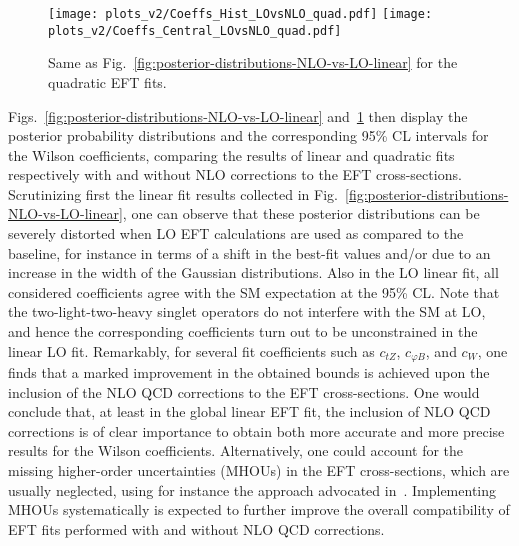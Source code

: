 \begin{figure}[htbp]
  \begin{center}
    \texttt{[image: plots\_v2/Coeffs\_Hist\_LOvsNLO\_quad.pdf]}
    \texttt{[image: plots\_v2/Coeffs\_Central\_LOvsNLO\_quad.pdf]}
    \caption{\small
      Same as Fig.~\ref{fig:posterior-distributions-NLO-vs-LO-linear}
      for the quadratic EFT fits.
      \label{fig:posterior-distributions-NLO-vs-LO-quad} }
  \end{center}
\end{figure}

Figs.~\ref{fig:posterior-distributions-NLO-vs-LO-linear}
and~\ref{fig:posterior-distributions-NLO-vs-LO-quad} then display the
posterior probability distributions 
and the corresponding 95\% CL intervals for the Wilson coefficients,
comparing the results of linear and quadratic fits respectively
with and without NLO corrections to the EFT cross-sections.
%
Scrutinizing first the linear fit results collected in
Fig.~\ref{fig:posterior-distributions-NLO-vs-LO-linear},
one can observe that these posterior distributions can be
severely distorted when LO EFT calculations are used as compared
to the baseline,
for instance in terms of a shift in the best-fit values and/or due
to an increase in the width of the Gaussian distributions.
%
Also in the LO linear fit, all considered coefficients
agree with the SM expectation at the 95\% CL.
%
Note that the two-light-two-heavy singlet operators do not
interfere with the SM at LO,
and hence the corresponding coefficients turn out to be unconstrained
in the linear LO fit.
%
Remarkably, for several fit coefficients
such as $c_{tZ}$, $c_{\varphi B}$, and $c_{W}$, one finds that a marked
improvement in the obtained bounds is achieved upon the inclusion
of the NLO QCD corrections to the EFT cross-sections.
%
One would conclude that, at least in the global linear EFT fit,
the inclusion of NLO QCD corrections
is of clear importance to obtain both more accurate and more precise results
for the Wilson coefficients.
%
Alternatively, one could account for the missing
higher-order uncertainties (MHOUs) in the EFT cross-sections, which
are usually neglected, using for instance the approach advocated
in~\cite{AbdulKhalek:2019bux,AbdulKhalek:2019ihb}.
%
Implementing MHOUs systematically is expected to further improve
the overall compatibility of EFT fits performed with and
without NLO QCD corrections.


